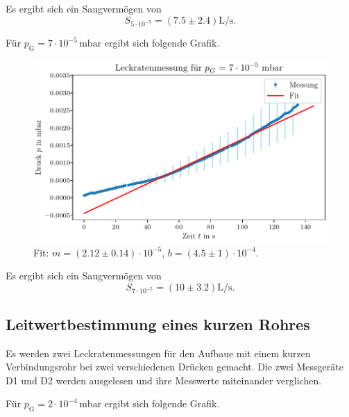 Es ergibt sich ein Saugvermögen von
\begin{equation}
    S_{5 \cdot 10^{-5}} = (\num{7.5} \pm \num{2.4}) \si{\liter\per\second}.
\end{equation}

Für $p_\text{G} = 7 \cdot 10^{-5} \, \si{\milli\bar}$ ergibt sich folgende Grafik.

\begin{figure}[H]
    \centering
    \includegraphics[width=\textwidth]{plots/TP_Leck_7e5.pdf}
    \caption{Fit: $m = (\num{2.12} \pm \num{0.14}) \cdot 10^{-5}$, $b = (\num{4.5} \pm \num{1}) \cdot 10^{-4}$.}
    \label{fig:TP_Leck_7e5}
\end{figure}

Es ergibt sich ein Saugvermögen von
\begin{equation}
    S_{7 \cdot 10^{-5}} = (\num{10} \pm \num{3.2}) \si{\liter\per\second}.
\end{equation}

\subsection{Leitwertbestimmung eines kurzen Rohres}

Es werden zwei Leckratenmessungen für den Aufbaue mit einem kurzen Verbindungsrohr bei zwei verschiedenen Drücken gemacht.
Die zwei Messgeräte D1 und D2 werden ausgelesen und ihre Messwerte miteinander verglichen.

Für $p_\text{G} = 2 \cdot 10^{-4} \, \si{\milli\bar}$ ergibt sich folgende Grafik.

